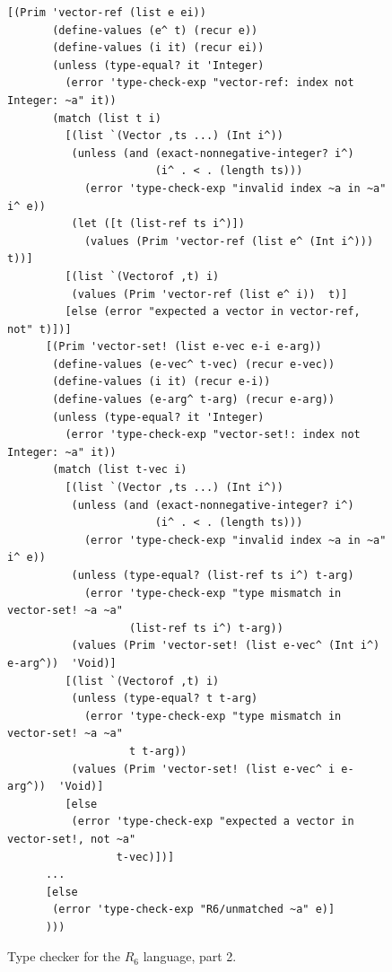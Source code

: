 \documentclass[11pt]{book}
\begin{document}
\begin{figure}[btp]
 \begin{lstlisting}[basicstyle=\ttfamily\footnotesize]
      [(Prim 'vector-ref (list e ei))
       (define-values (e^ t) (recur e))
       (define-values (i it) (recur ei))
       (unless (type-equal? it 'Integer)
         (error 'type-check-exp "vector-ref: index not Integer: ~a" it))
       (match (list t i)
         [(list `(Vector ,ts ...) (Int i^))
          (unless (and (exact-nonnegative-integer? i^)
                       (i^ . < . (length ts)))
            (error 'type-check-exp "invalid index ~a in ~a" i^ e))
          (let ([t (list-ref ts i^)])
            (values (Prim 'vector-ref (list e^ (Int i^))) t))]
         [(list `(Vectorof ,t) i)
          (values (Prim 'vector-ref (list e^ i))  t)]
         [else (error "expected a vector in vector-ref, not" t)])]
      [(Prim 'vector-set! (list e-vec e-i e-arg))
       (define-values (e-vec^ t-vec) (recur e-vec))
       (define-values (i it) (recur e-i))
       (define-values (e-arg^ t-arg) (recur e-arg))
       (unless (type-equal? it 'Integer)
         (error 'type-check-exp "vector-set!: index not Integer: ~a" it))
       (match (list t-vec i)
         [(list `(Vector ,ts ...) (Int i^))
          (unless (and (exact-nonnegative-integer? i^)
                       (i^ . < . (length ts)))
            (error 'type-check-exp "invalid index ~a in ~a" i^ e))
          (unless (type-equal? (list-ref ts i^) t-arg)
            (error 'type-check-exp "type mismatch in vector-set! ~a ~a" 
                   (list-ref ts i^) t-arg))
          (values (Prim 'vector-set! (list e-vec^ (Int i^) e-arg^))  'Void)]
         [(list `(Vectorof ,t) i)
          (unless (type-equal? t t-arg)
            (error 'type-check-exp "type mismatch in vector-set! ~a ~a" 
                   t t-arg))
          (values (Prim 'vector-set! (list e-vec^ i e-arg^))  'Void)]
         [else
          (error 'type-check-exp "expected a vector in vector-set!, not ~a"
                 t-vec)])]
      ...
      [else 
       (error 'type-check-exp "R6/unmatched ~a" e)]
      )))
\end{lstlisting}
\caption{Type checker for the $R_6$ language, part 2.}
\label{fig:type-check-R6-part-2}
\end{figure}


\end{document}
